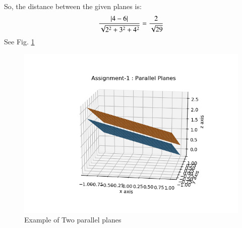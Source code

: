 So, the distance between the given planes is:
\begin{align}
   \frac{\left\vert4 - 6\right\vert}{\sqrt{2^2+3^2+4^2}}   =   \frac{2}{\sqrt{29}}    
\end{align}
See Fig.        \ref{fig:parallel_planessolutions/line_plane/110/}

\begin{figure}[t]
    \centering
    \includegraphics[width = \columnwidth]{./solutions/line_plane/110/parallel planes.png}
    \caption{Example of Two parallel planes}
    \label{fig:parallel_planessolutions/line_plane/110/}
\end{figure}

